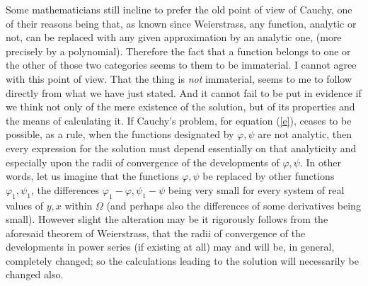 \documentclass[12pt,oneside]{book}
\newcommand{\iit}[1]{\textit{#1}}
\begin{document}
Some mathematicians still incline to prefer the old point of view of Cauchy, one
of their reasons being that, as known since Weierstrass, any function, analytic
or not, can be replaced with any given approximation by an analytic one, (more
precisely by a polynomial). Therefore the fact that a function belongs to one or
the other of those two categories seems to them to be immaterial. I cannot agree
with this point of view. That the thing is \iit{not} immaterial, seems to me to
follow directly from what we have just stated. And it cannot fail to be put in
evidence if we think not only of the mere existence of the solution, but of its
properties and the means of calculating it. If Cauchy's problem, for equation
(\ref{e}), ceases to be possible, as a rule, when the functions designated by
$\varphi,\psi$ are not analytic, then every expression for the solution must
depend essentially on that analyticity and especially upon the radii of
convergence of the developments of $\varphi,\psi$. In other words, let us
imagine that the functions $\varphi,\psi$ be replaced by other functions
$\varphi_1,\psi_1$, the differences $\varphi_1-\varphi,\psi_1-\psi$ being very
small for every system of real values of $y,x$ within $\Omega$ (and perhaps also
the differences of some derivatives being small). However slight the alteration
may be it rigorously follows from the aforesaid theorem of Weierstrass, that the
radii of convergence of the developments in power series (if existing at all)
may and will be, in general, completely changed; so the calculations leading to
the solution will necessarily be changed also. \par
\end{document}
